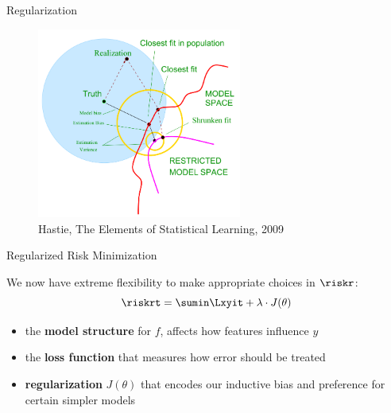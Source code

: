 \begin{frame}{Regularization}

\begin{center}
\begin{figure}
\includegraphics[width=0.6\textwidth]{plots/biasvariance_scheme.png}
\caption{\footnotesize{Hastie, The Elements of Statistical Learning, 2009}}
\end{figure}
\end{center}

\end{frame}

\begin{frame}{Regularized Risk Minimization}

We now have extreme flexibility to make appropriate choices in
\(\riskr\): \[
\riskrt = \sumin \Lxyit + \lambda \cdot J(\theta)
\]

\begin{itemize}

\item
  the \textbf{model structure} for \(f\), affects how features influence
  \(y\)
\item
  the \textbf{loss function} that measures how error should be treated
\item
  \textbf{regularization} \(J(\theta)\) that encodes our inductive bias
  and preference for certain simpler models
\end{itemize}

\end{frame}

